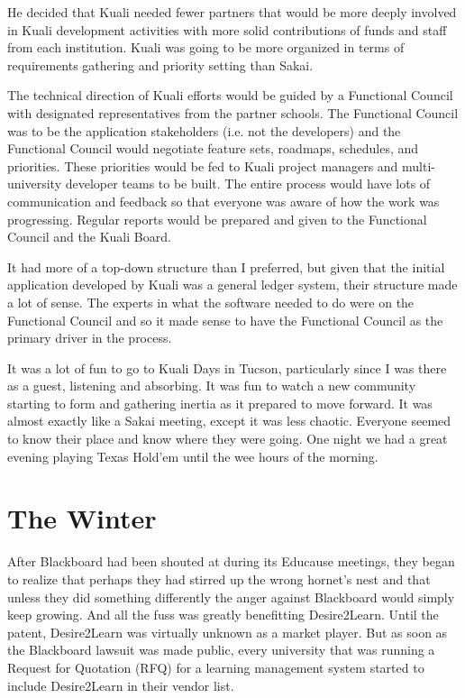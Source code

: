\documentclass[12pt]{book}
\begin{document}
He decided that Kuali needed fewer partners that
would be more deeply
involved in Kuali development activities
with more solid contributions of funds and staff
from each institution.
Kuali was going to be more organized in terms of
requirements gathering and priority setting than Sakai.

The technical direction of Kuali efforts would be guided
by a Functional Council with designated
representatives from the partner schools.  The Functional Council
was to be the application stakeholders (i.e. not the developers)
and the Functional Council would negotiate feature sets, roadmaps,
schedules, and priorities.   These priorities would be fed
to Kuali project managers and multi-university developer teams
to be built.  The entire process would have lots of communication
and feedback so that everyone was aware of how the work
was progressing.  Regular reports would be prepared and given
to the Functional Council and the Kuali Board.

It had more of a top-down structure than I preferred, but given
that the initial application developed by Kuali
was a general ledger system, their structure made a lot
of sense.  The experts in what the
software needed to do were on the Functional Council and
so it made sense to have the Functional Council as the primary
driver in the process.

It was a lot of fun to go to Kuali Days in Tucson, particularly
since I was there as a guest, listening and absorbing.  It was
fun to watch a new community starting to form and gathering
inertia as it prepared to move forward.  It was almost exactly
like a Sakai meeting, except it was less chaotic.  Everyone seemed
to know their place and know where they were going.  One night
we had a great evening playing Texas Hold'em until the wee hours
of the morning.




\chapter{The Winter}

After Blackboard had been shouted at during its Educause
meetings, they began to realize that perhaps they had stirred
up the wrong hornet's nest and that unless they did something
differently the anger against Blackboard would simply keep
growing.  And all the fuss was greatly benefitting Desire2Learn.
Until the patent, Desire2Learn was virtually unknown as a market
player.  But as soon as the Blackboard lawsuit was made public,
every university that was running a Request for Quotation (RFQ)
for a learning management system started to include Desire2Learn
in their vendor list.
\end{document}
